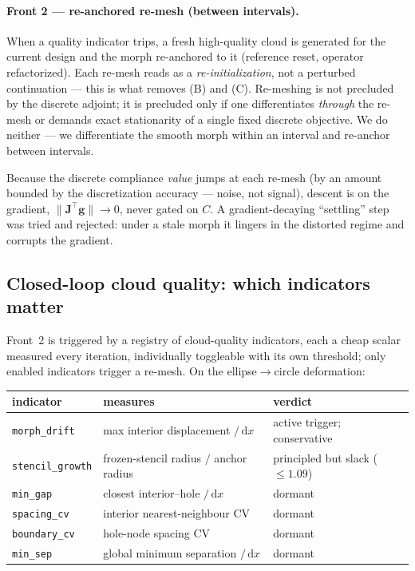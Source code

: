 \documentclass[11pt,a4paper]{article}
\newcommand{\mat}[1]{\mathbf{#1}}
\newcommand{\vect}[1]{\boldsymbol{#1}}
\begin{document}
\paragraph{Front 2 --- re-anchored re-mesh (between intervals).} When a quality
indicator trips, a fresh high-quality cloud is generated for the current design
and the morph re-anchored to it (reference reset, operator refactorized). Each
re-mesh reads as a \emph{re-initialization}, not a perturbed continuation --- this
is what removes (B) and (C). Re-meshing is not precluded by the discrete adjoint;
it is precluded only if one differentiates \emph{through} the re-mesh or demands
exact stationarity of a single fixed discrete objective. We do neither --- we
differentiate the smooth morph within an interval and re-anchor between intervals.

Because the discrete compliance \emph{value} jumps at each re-mesh (by an amount
bounded by the discretization accuracy --- noise, not signal), descent is on the
gradient, $\lVert\mat J^\top\vect g\rVert\to0$, never gated on $C$. A
gradient-decaying ``settling'' step was tried and rejected: under a stale morph it
lingers in the distorted regime and corrupts the gradient.

\subsection{Closed-loop cloud quality: which indicators matter}
\label{sec:plate-indicators}

Front~2 is triggered by a registry of cloud-quality indicators, each a cheap
scalar measured every iteration, individually toggleable with its own threshold;
only enabled indicators trigger a re-mesh. On the ellipse$\to$circle deformation:

\begin{center}
\begin{tabular}{lll}
\hline
indicator & measures & verdict \\
\hline
\texttt{morph\_drift} & max interior displacement $/\,\mathrm{d}x$ & active trigger; conservative \\
\texttt{stencil\_growth} & frozen-stencil radius $/$ anchor radius & principled but slack ($\le1.09$) \\
\texttt{min\_gap} & closest interior--hole $/\,\mathrm{d}x$ & dormant \\
\texttt{spacing\_cv} & interior nearest-neighbour CV & dormant \\
\texttt{boundary\_cv} & hole-node spacing CV & dormant \\
\texttt{min\_sep} & global minimum separation $/\,\mathrm{d}x$ & dormant \\
\hline
\end{tabular}
\end{center}
\end{document}
